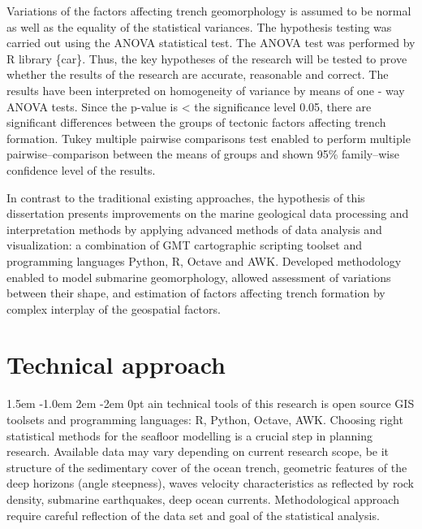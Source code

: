 \documentclass[11pt,a4paper]{report}
\def\pstart#1{\noindent\smash{\lower1.5ex\hbox{\llap{\Cal#1}}\hskip-.1ex}
  \parshape=3 1.5em \dimexpr\hsize-1.0em 2em \dimexpr\hsize-2em 0pt \hsize}
\begin{document}
Variations of the factors affecting trench geomorphology is assumed to be normal as well as the equality of the statistical variances. The hypothesis testing was carried out using the \ac{ANOVA} statistical test. The \ac{ANOVA} test was performed by R library \{car\}. Thus, the key hypotheses of the research will be tested to prove whether the results of the research are accurate, reasonable and correct. The results have been interpreted on homogeneity of variance by means of one - way \ac{ANOVA} tests. Since the p-value is < the significance level 0.05, there are significant differences between the groups of tectonic factors affecting trench formation. Tukey multiple pairwise comparisons test enabled to perform multiple pairwise–comparison between the means of groups and shown 95\% family–wise confidence level of the results.

In contrast to the traditional existing approaches, the hypothesis of this dissertation presents improvements on the marine geological data processing and interpretation methods by applying advanced methods of data analysis and visualization: a combination of \ac{GMT} cartographic scripting toolset and programming languages Python, R, Octave and AWK. Developed methodology enabled to model submarine geomorphology, allowed assessment of variations between their shape, and estimation of factors affecting trench formation by complex interplay of the geospatial factors.

\pagebreak
\section{Technical approach}
\pstart Main technical tools of this research is open source \ac{GIS} toolsets and programming languages: R, Python, Octave, AWK. Choosing right statistical methods for the seafloor modelling is a crucial step in planning research. Available data may vary depending on current research scope, be it structure of the sedimentary cover of the ocean trench, geometric features of the deep horizons (angle steepness), waves velocity characteristics as reflected by rock density, submarine earthquakes, deep ocean currents. Methodological approach require careful reflection of the data set and goal of the statistical analysis. 
\end{document}
